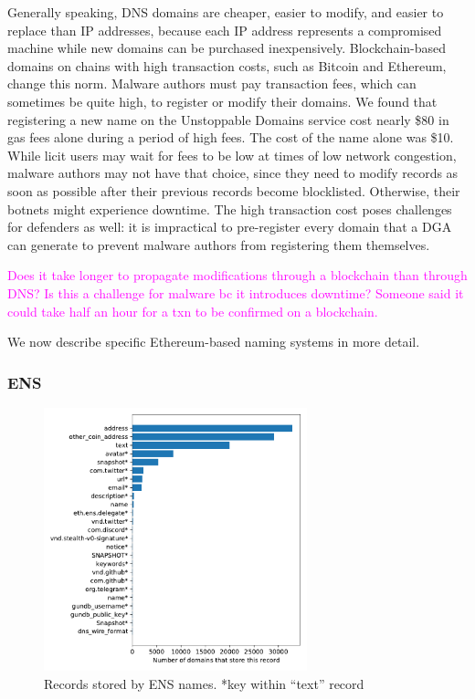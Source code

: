 \documentclass[10pt,sigconf,letterpaper]{acmart}
\newcommand{\randall}{\ding{110}\ding{43}\textcolor{magenta}}
\newcommand{\randall}{}
\begin{document}
Generally speaking, DNS domains are cheaper, easier to modify, and easier to replace than IP 
addresses, because each IP address represents a compromised machine while new domains can be 
purchased inexpensively. Blockchain-based domains on chains with high transaction costs, such as 
Bitcoin and Ethereum, change this norm. Malware authors must pay transaction fees, which can 
sometimes be quite high, to register or modify their domains. We found that registering a new name 
on the Unstoppable Domains service cost nearly \$80 in gas fees alone during a period of high fees. 
The cost of the name alone was \$10. While licit users may wait for fees to be low at times of low 
network congestion, malware authors may not have that choice, since they need to modify records as 
soon as possible after their previous records become blocklisted. Otherwise, their botnets might 
experience downtime. The high transaction cost poses challenges for defenders as well: it is 
impractical to pre-register every domain that a DGA can generate to prevent malware authors from 
registering them themselves. 

\randall{Does it take longer to propagate modifications through a blockchain 
than through DNS? Is this a challenge for malware bc it introduces downtime? 
Someone said it could take half an hour for a txn to be confirmed on a 
blockchain.}

We now describe specific Ethereum-based naming systems in more detail.

\subsubsection{ENS}

\begin{figure}[t]
	\centering
	\includegraphics[width=3in]{figs/ens_names.pdf}
	\caption{Records stored by ENS names. *key within ``text'' record}
	\label{fig:ens_records}
\end{figure}
\end{document}
